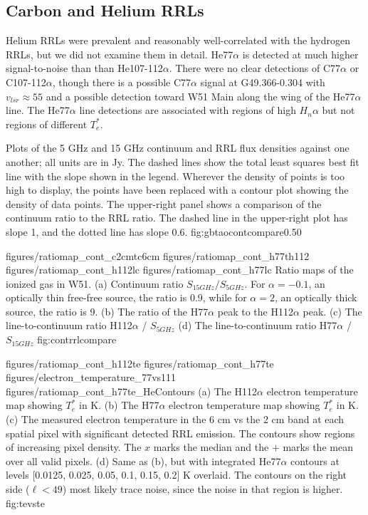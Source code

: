 \subsection{Carbon and Helium RRLs}
Helium RRLs were prevalent and reasonably well-correlated with the hydrogen
RRLs, but we did not examine them in detail.  He77$\alpha$ is detected at much
higher signal-to-noise than than He107-112$\alpha$.  There were no clear
detections of C77$\alpha$ or C107-112$\alpha$, though there is a possible
C77$\alpha$ signal at G49.366-0.304 with $v_{lsr} \approx 55$ \kms and a
possible detection toward W51 Main along the wing of the He77$\alpha$ line.
The He77$\alpha$ line detections are associated with regions of high $H_n\alpha$
but not regions of different $T_e^*$.


{Plots of the 5 GHz and 15 GHz continuum and RRL flux densities against one
another; all units are in Jy.  The dashed lines show the total least squares
best fit line with the slope shown in the legend.  Wherever the density of
points is too high to display, the points have been replaced with a contour
plot showing the density of data points.  The upper-right panel shows a
comparison of the continuum ratio to the RRL ratio.  The dashed line in the
upper-right plot has slope 1, and the dotted line has slope 0.6.}
{fig:gbtaocontcompare}{0.5}{0}

\FigureFour
{figures/ratiomap_cont_c2cmtc6cm}
{figures/ratiomap_cont_h77th112}
{figures/ratiomap_cont_h112lc}
{figures/ratiomap_cont_h77lc}
{Ratio maps of the ionized gas in W51.  
(a) Continuum ratio $S_{15 GHz} / S_{5 GHz}$.  For $\alpha=-0.1$, an optically
thin free-free source, the ratio is 0.9, while for $\alpha=2$, an optically thick source,
the ratio is 9.
(b) The ratio of the H77$\alpha$ peak to the H112$\alpha$ peak.
(c) The line-to-continuum ratio H112$\alpha$ / $S_{5 GHz}$
(d) The line-to-continuum ratio H77$\alpha$ / $S_{15 GHz}$
}
{fig:contrrlcompare}

\FigureFourPDF
{figures/ratiomap_cont_h112te}
{figures/ratiomap_cont_h77te}
{figures/electron_temperature_77vs111}
{figures/ratiomap_cont_h77te_HeContours}
{(a) The H112$\alpha$ electron temperature map showing $T_e^*$ in K. 
(b) The H77$\alpha$ electron temperature map showing $T_e^*$ in K.
(c) The measured electron temperature in the 6 cm vs the 2 cm band at each spatial
pixel with significant detected RRL emission.  The contours show regions of
increasing pixel density.  The $x$ marks the median and the $+$ marks the mean
over all valid pixels.
(d) Same as (b), but with integrated He77$\alpha$ contours at levels [0.0125,
0.025, 0.05, 0.1, 0.15, 0.2] K \kms overlaid.  The contours on the right side
($\ell<49$) most likely trace noise, since the noise in that region is higher.
}
{fig:tevste}%

